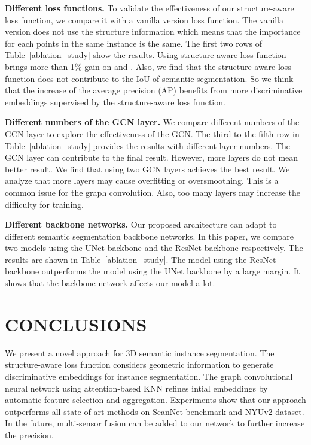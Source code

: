\documentclass{article}
\begin{document}
\textbf{Different loss functions. }
To validate the effectiveness of our structure-aware loss function, we compare it with a vanilla version loss function. The vanilla version does not use the structure information which means that the importance for each points in the same instance is the same. The first two rows of Table~\ref{ablation_study} show the results. Using structure-aware loss function brings more than 1\% gain on  and . Also, we find that the structure-aware loss function does not contribute to the IoU of semantic segmentation. So we think that the increase of the average precision (AP) benefits from more discriminative embeddings supervised by the structure-aware loss function.

\textbf{Different numbers of the GCN layer. }
We compare different numbers of the GCN layer to explore the effectiveness of the GCN. The third to the fifth row in Table~\ref{ablation_study} provides the results with different layer numbers. The GCN layer can contribute to the final result. However, more layers do not mean better result. We find that using two GCN layers achieves the best result. We analyze that more layers may cause overfitting or oversmoothing. This is a common issue for the graph convolution. Also, too many layers may increase the difficulty for training.

\textbf{Different backbone networks. }
Our proposed architecture can adapt to different semantic segmentation backbone networks. In this paper, we compare two models using the UNet backbone and the ResNet backbone respectively. The results are shown in Table~\ref{ablation_study}. The model using the ResNet backbone outperforms the model using the UNet backbone by a large margin. It shows that the backbone network affects our model a lot.


\section{CONCLUSIONS}
We present a novel approach for 3D semantic instance segmentation. The structure-aware loss function considers geometric information to generate discriminative embeddings for instance segmentation. The graph convolutional neural network using attention-based KNN refines intial embeddings by automatic feature selection and aggregation. Experiments show that our approach outperforms all state-of-art methods on ScanNet benchmark and NYUv2 dataset. In the future, multi-sensor fusion can be added to our network to further increase the precision.



\end{document}
